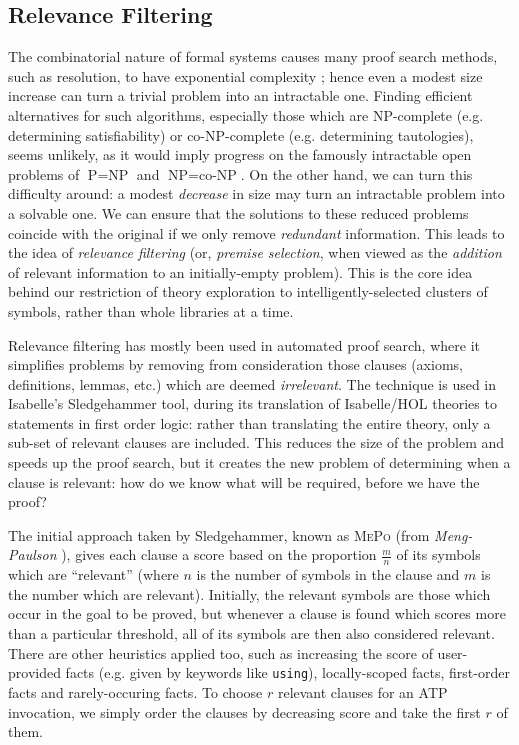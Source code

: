 \subsection{Relevance Filtering}
\label{sec:relevance}

The combinatorial nature of formal systems causes many proof search methods, such as resolution, to have exponential complexity \citep{haken1985intractability}; hence even a modest size increase can turn a trivial problem into an intractable one. Finding efficient alternatives for such algorithms, especially those which are NP-complete (e.g. determining satisfiability) or co-NP-complete (e.g. determining tautologies), seems unlikely, as it would imply progress on the famously intractable open problems of $\text{P} = \text{NP}$ and $\text{NP} = \text{co-NP}$. On the other hand, we can turn this difficulty around: a modest \emph{decrease} in size may turn an intractable problem into a solvable one. We can ensure that the solutions to these reduced problems coincide with the original if we only remove \emph{redundant} information. This leads to the idea of \emph{relevance filtering} (or, \emph{premise selection}, when viewed as the \emph{addition} of relevant information to an initially-empty problem). This is the core idea behind our restriction of theory exploration to intelligently-selected clusters of symbols, rather than whole libraries at a time.

Relevance filtering has mostly been used in automated proof search, where it simplifies problems by removing from consideration those clauses (axioms, definitions, lemmas, etc.) which are deemed \emph{irrelevant}. The technique is used in Isabelle's Sledgehammer tool, during its translation of Isabelle/HOL theories to statements in first order logic: rather than translating the entire theory, only a sub-set of relevant clauses are included. This reduces the size of the problem and speeds up the proof search, but it creates the new problem of determining when a clause is relevant: how do we know what will be required, before we have the proof?

The initial approach taken by Sledgehammer, known as \textsc{MePo} (from \emph{Meng-Paulson} \citep{meng2009lightweight}), gives each clause a score based on the proportion $\frac{m}{n}$ of its symbols which are ``relevant'' (where $n$ is the number of symbols in the clause and $m$ is the number which are relevant). Initially, the relevant symbols are those which occur in the goal to be proved, but whenever a clause is found which scores more than a particular threshold, all of its symbols are then also considered relevant. There are other heuristics applied too, such as increasing the score of user-provided facts (e.g. given by keywords like \texttt{using}), locally-scoped facts, first-order facts and rarely-occuring facts. To choose $r$ relevant clauses for an ATP invocation, we simply order the clauses by decreasing score and take the first $r$ of them.

